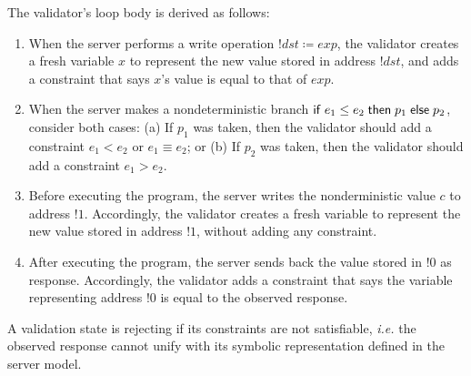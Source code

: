 The validator's loop body is derived as follows:
\begin{enumerate}
  \item When the server performs a write operation $!dst\coloneqq exp$, the
    validator creates a fresh variable $x$ to represent the new value stored in
    address $!dst$, and adds a constraint that says $x$'s value is equal to
    that of $exp$.
  \item When the server makes a nondeterministic branch $\mathsf{if}\; e_1\le e_2\;\mathsf{then}\;
    p_1\;\mathsf{else}\; p_2$, consider both cases: (a) If $p_1$ was taken, then the
    validator should add a constraint $e_1<e_2$ or $e_1\equiv e_2$; or (b) If $p_2$
    was taken, then the validator should add a constraint $e_1>e_2$.
  \item Before executing the program, the server writes the nonderministic value
    $c$ to address $!1$.  Accordingly, the validator creates a fresh variable to
    represent the new value stored in address $!1$, without adding any
    constraint.
  \item After executing the program, the server sends back the value stored in
    $!0$ as response.  Accordingly, the validator adds a constraint that says
    the variable representing address $!0$ is equal to the observed response.
\end{enumerate}
A validation state is rejecting if its constraints are not satisfiable, {\it
  i.e.} the observed response cannot unify with its symbolic representation
defined in the server model.

